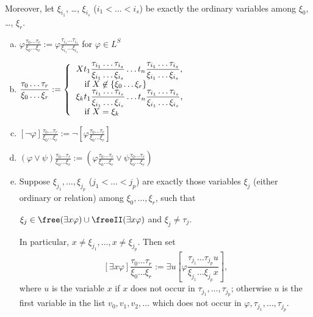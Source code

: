 \begin{enumerate}[1.]
\begin{enumerate}[(1)]
\ \\
Moreover, let $\xi_{i_1}$, \ldots, $\xi_{i_s}$ ($i_1 < \ldots < i_s$) be exactly the ordinary variables among $\xi_0$, \ldots, $\xi_r$.
\begin{enumerate}[(a)]
\item $\varphi \displaystyle \frac{\tau_0 \ldots \tau_r}{\xi_0 \ldots \xi_r} := \varphi\frac{\tau_{i_1} \ldots \tau_{i_s}}{\xi_{i_1} \ldots \xi_{i_s}}$ for $\varphi \in L^S$
\item \begin{math} [X t_1 \ldots t_n] \displaystyle \frac{\tau_0 \ldots \tau_r}{\xi_0 \ldots \xi_r} := \left\{
\begin{tabular}{l}
$X t_1 \displaystyle \frac{\tau_{i_1} \ldots \tau_{i_s}}{\xi_{i_1} \ldots \xi_{i_s}} \ldots t_n \frac{\tau_{i_1} \ldots \tau_{i_s}}{\xi_{i_1} \ldots \xi_{i_s}}$, \cr
\ \ \ if $X \not \in \{ \xi_0 \ldots \xi_r \}$ \cr
$\xi_k t_1 \displaystyle \frac{\tau_{i_1} \ldots \tau_{i_s}}{\xi_{i_1} \ldots \xi_{i_s}} \ldots t_n \frac{\tau_{i_1} \ldots \tau_{i_s}}{\xi_{i_1} \ldots \xi_{i_s}}$, \cr
\ \ \ if $X = \xi_k$
\end{tabular}
\right.
\end{math}
\item $[\neg \varphi] \displaystyle \frac{\tau_0 \ldots \tau_r}{\xi_0 \ldots \xi_r} := \neg \left[\varphi \frac{\tau_0 \ldots \tau_r}{\xi_0 \ldots \xi_r} \right]$
\item $(\varphi \lor \psi) \displaystyle \frac{\tau_0 \ldots \tau_r}{\xi_0 \ldots \xi_r} := \left(\varphi \displaystyle\frac{\tau_0 \ldots \tau_r}{\xi_0 \ldots \xi_r} \lor \psi \displaystyle \frac{\tau_0 \ldots \tau_r}{\xi_0 \ldots \xi_r} \right)$
\item Suppose $\xi_{j_1}, \ldots, \xi_{j_p}$ ($j_1 < \ldots < j_p$) are exactly those variables $\xi_j$ (either ordinary or relation) among $\xi_0, \ldots, \xi_r$, such that
\begin{center}
$\xi_j \in \free(\exists x \varphi) \cup \freeII(\exists x \varphi)$ and $\xi_j \neq \tau_j$.
\end{center}
In particular, $x \neq \xi_{j_1}, \ldots, x \neq \xi_{j_p}$. Then set
\[
[\exists x \varphi] \frac{\tau_0 \ldots \tau_r}{\xi_0 \ldots \xi_r} := \exists u \left[ \varphi \frac{\tau_{j_1} \ldots \tau_{j_p} u}{\xi_{j_1} \ldots \xi_{j_p} x} \right],
\]
where $u$ is the variable $x$ if $x$ does not occur in $\tau_{j_1}, \ldots, \tau_{j_p}$; otherwise $u$ is the first variable in the list $v_0, v_1, v_2, \ldots$ which does not occur in $\varphi, \tau_{j_1}, \ldots, \tau_{j_p}$.

\end{enumerate}
\end{enumerate}
\end{enumerate}
